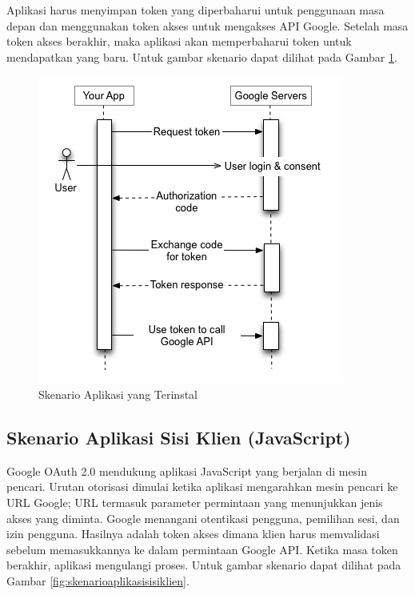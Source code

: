 Aplikasi harus menyimpan token yang diperbaharui untuk penggunaan masa depan dan menggunakan token akses untuk mengakses API Google. Setelah masa token akses berakhir, maka aplikasi akan memperbaharui token untuk mendapatkan yang baru. Untuk gambar skenario dapat dilihat pada Gambar \ref{fig:skenarioaplikasiyangterinstal}.

\begin{figure}[H]
\centering
\includegraphics[scale=1]{Gambar/skenario1.png}
\caption[Gambar Skenario Aplikasi yang Terinstal]{Skenario Aplikasi yang Terinstal} 
\label{fig:skenarioaplikasiyangterinstal}
\end{figure}

\subsection{Skenario Aplikasi Sisi Klien (JavaScript)}
Google OAuth 2.0 mendukung aplikasi JavaScript yang berjalan di mesin pencari. Urutan otorisasi dimulai ketika aplikasi mengarahkan mesin pencari ke URL Google; URL termasuk parameter permintaan yang menunjukkan jenis akses yang diminta. Google menangani otentikasi pengguna, pemilihan sesi, dan izin pengguna. Hasilnya adalah token akses dimana klien harus memvalidasi sebelum memasukkannya ke dalam permintaan Google API. Ketika masa token berakhir, aplikasi mengulangi proses. Untuk gambar skenario dapat dilihat pada Gambar \ref{fig:skenarioaplikasisisiklien}.

